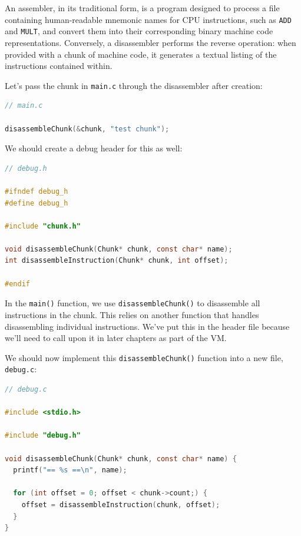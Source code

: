 An assembler, in its traditional form, is a program designed to process a file containing human-readable mnemonic names for CPU instructions, such as \verb.ADD. and \verb.MULT., and convert them into their corresponding binary machine code representations. Conversely, a disassembler performs the reverse operation: when provided with a chunk of machine code, it generates a textual listing of the instructions contained within.

Let's pass the chunk in \verb,main.c, through the disassembler after creation:

\begin{lstlisting}[language=C]
// main.c

disassembleChunk(&chunk, "test chunk");
\end{lstlisting}

We should create a debug header for this as well:

\begin{lstlisting}[language=C]
// debug.h

#ifndef debug_h
#define debug_h

#include "chunk.h"

void disassembleChunk(Chunk* chunk, const char* name);
int disassembleInstruction(Chunk* chunk, int offset);

#endif
\end{lstlisting}

In the \verb.main(). function, we use \verb.disassembleChunk(). to disassemble all instructions in the chunk. This relies on another function that handles disassembling individual instructions. We've put this in the header file because we'll need to call upon it in later chapters as part of the \ac{VM}.

We should now implement this \verb.disassembleChunk(). function into a new file, \verb,debug.c,:

\begin{lstlisting}[language=C]
// debug.c

#include <stdio.h>

#include "debug.h"

void disassembleChunk(Chunk* chunk, const char* name) {
  printf("== %s ==\n", name);

  for (int offset = 0; offset < chunk->count;) {
    offset = disassembleInstruction(chunk, offset);
  }
}
\end{lstlisting}




